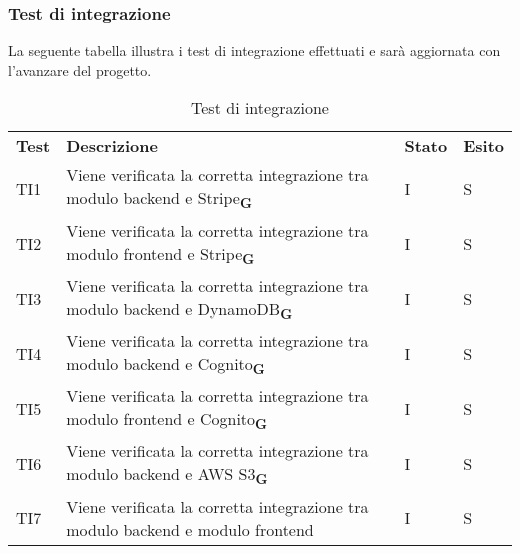 \subsubsection{Test di integrazione}
La seguente tabella illustra i test di integrazione effettuati e sarà aggiornata con l'avanzare del progetto.
\begin{center}
    \centering
    \renewcommand{\arraystretch}{1.8}
    \label{tab:TestIntegrazione}
    \begin{longtable}[!h]{p{45px} p{255px} p{35px} p{35px}}
        \caption{Test di integrazione}                                                                                                                      \\
        \rowcolor{logo!70}
        \textbf{Test} & \textbf{Descrizione}                                                                              & \textbf{Stato} & \textbf{Esito} \\
        TI1           & Viene verificata la corretta integrazione tra modulo backend e Stripe\textsubscript{\textbf{G}}   & I              & S              \\
        TI2           & Viene verificata la corretta integrazione tra modulo frontend e Stripe\textsubscript{\textbf{G}}  & I              & S              \\
        TI3           & Viene verificata la corretta integrazione tra modulo backend e DynamoDB\textsubscript{\textbf{G}} & I              & S              \\
        TI4           & Viene verificata la corretta integrazione tra modulo backend e Cognito\textsubscript{\textbf{G}}  & I              & S              \\
        TI5           & Viene verificata la corretta integrazione tra modulo frontend e Cognito\textsubscript{\textbf{G}} & I              & S              \\
        TI6           & Viene verificata la corretta integrazione tra modulo backend e AWS S3\textsubscript{\textbf{G}}   & I              & S              \\
        TI7           & Viene verificata la corretta integrazione tra modulo backend e modulo frontend                    & I              & S              \\
    \end{longtable}
\end{center}
\pagebreak
